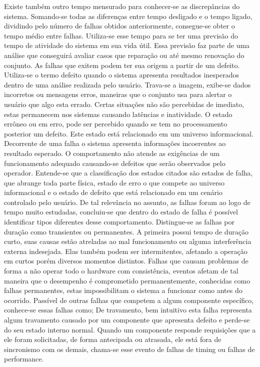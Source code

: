 Existe também outro tempo mensurado para conhecer-se as discrepâncias do sistema. Somando-se todas as diferenças entre tempo desligado e o tempo ligado, dividindo pelo número de falhas obtidos anteriormente, consegue-se obter o tempo médio entre falhas. Utiliza-se esse tempo para se ter uma previsão do tempo de atividade do sistema em sua vida útil. Essa previsão faz parte de uma análise que conseguirá avaliar casos que reparação ou até mesmo renovação do conjunto.
As falhas que exitem podem ter sua origem a partir de um defeito. Utiliza-se o termo defeito quando o sistema apresenta resultados inesperados dentro de uma análise realizada pelo usuário. Trava-se a imagem, exibe-se dados incorretos ou mensagens erros, maneiras que o conjunto usa para alertar o usuário que algo esta errado. Certas situações não são percebidas de imediato, estas permanecem nos sistemas causando latências e inatividade.
O estado errôneo ou em erro, pode ser percebido quando se tem no processamento posterior um defeito. Este estado está relacionado em um universo informacional. Decorrente de uma falha o sistema apresenta informações incoerentes ao resultado esperado. O comportamento não atende as exigências de um funcionamento adequado causando-se defeitos que serão observados pelo operador. Entende-se que a classificação dos estados citados são estados de falha, que abrange toda parte física, estado de erro o que compete ao universo informacional e o estado de defeito que está relacionado em um cenário controlado pelo usuário.
De tal relevância no assunto, as falhas foram ao logo de tempo muito estudadas, concluiu-se que dentro do estado de falha é possível identificar tipos diferentes desse comportamento.
Distingue-se as falhas por duração como transientes ou permanentes. A primeira possui tempo de duração curto, suas causas estão atreladas ao mal funcionamento ou alguma interferência externa indesejada. Elas também podem ser intermitentes, afetando a operação em curtos porém diversos momentos distintos.
Falhas que causam problemas de forma a não operar todo o hardware com consistência,
 eventos afetam de tal maneira que o desempenho é comprometido permanentemente, conhecidas como falhas permanentes, estas impossibilitam o sistema a funcionar como antes do ocorrido.
Passível de outras falhas que competem a algum componente específico, conhece-se essas falhas como;
De travamento, bem intuitivo esta falha representa algum travamento causado por um componente que apresenta defeito e perde-se do seu estado interno normal.
Quando um componente responde requisições que a ele foram solicitadas, de forma antecipada ou atrasada, ele está fora de sincronismo com os demais, chama-se esse evento de falhas de timing ou falhas de performance.
